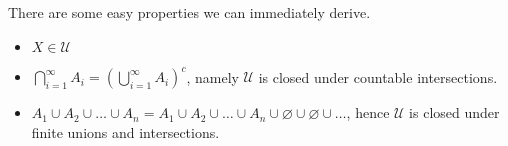 \begin{remark}
	There are some easy properties we can immediately derive.
	\begin{itemize}
		\item \(X\in \mathcal{U} \)
		\item \(\bigcap\limits_{i=1}^{\infty} A_{i} = \left(\bigcup\limits_{i=1}^{\infty} A_{i}\right)^c\), namely \(\mathcal{U} \) is closed under countable intersections.
		\item \(A_1\cup A_2 \cup \ldots \cup A_n = A_1\cup A_2 \cup \ldots \cup A_n \cup \varnothing \cup \varnothing \cup\ldots\), hence \(\mathcal{U} \) is closed under finite unions and intersections.
	\end{itemize}
\end{remark}